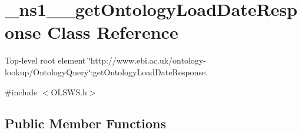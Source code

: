 \hypertarget{class__ns1____getOntologyLoadDateResponse}{
\section{\_\-ns1\_\-\_\-getOntologyLoadDateResponse Class Reference}
\label{class__ns1____getOntologyLoadDateResponse}
}


Top-\/level root element \char`\"{}http://www.ebi.ac.uk/ontology-\/lookup/OntologyQuery\char`\"{}:getOntologyLoadDateResponse.  




{\ttfamily \#include $<$OLSWS.h$>$}

\subsection*{Public Member Functions}
